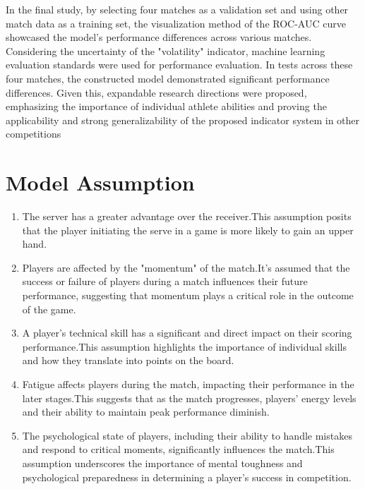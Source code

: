 \documentclass[12pt]{article}
\begin{document}
In the final study, by selecting four matches as a validation set and using other match data as a training set, the visualization method of the ROC-AUC curve showcased the model's performance differences across various matches. Considering the uncertainty of the "volatility" indicator, machine learning evaluation standards were used for performance evaluation. In tests across these four matches, the constructed model demonstrated significant performance differences. Given this, expandable research directions were proposed, emphasizing the importance of individual athlete abilities and proving the applicability and strong generalizability of the proposed indicator system in other competitions


\section{Model Assumption}
\begin{enumerate}
\item The server has a greater advantage over the receiver.This assumption posits that the player initiating the serve in a game is more likely to gain an upper hand.
\item Players are affected by the "momentum" of the match.It's assumed that the success or failure of players during a match influences their future performance, suggesting that momentum plays a critical role in the outcome of the game.
\item A player's technical skill has a significant and direct impact on their scoring performance.This assumption highlights the importance of individual skills and how they translate into points on the board.
\item Fatigue affects players during the match, impacting their performance in the later stages.This suggests that as the match progresses, players' energy levels and their ability to maintain peak performance diminish.
\item The psychological state of players, including their ability to handle mistakes and respond to critical moments, significantly influences the match.This assumption underscores the importance of mental toughness and psychological preparedness in determining a player's success in competition.
\end{enumerate}
\end{document}
